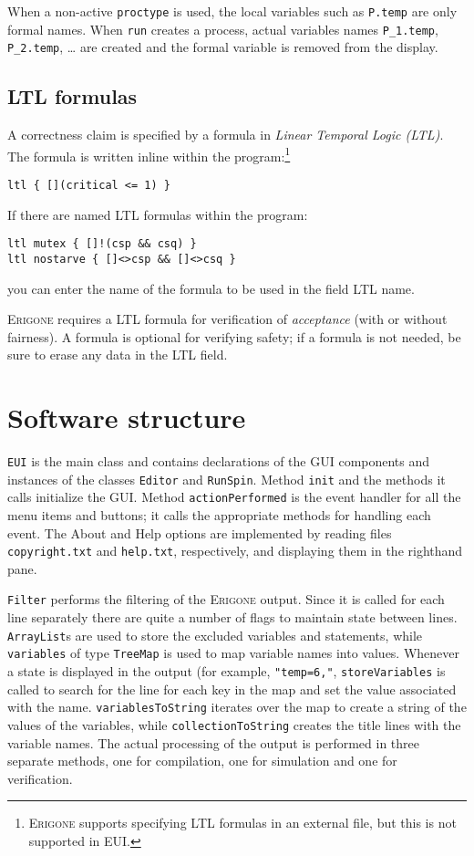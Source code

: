 \documentclass[11pt]{article}
\newcommand{\eri}{\textsc{Erigone}}
\newcommand{\eui}{\textsc{EUI}}
\newcommand{\p}[1]{\texttt{#1}}
\newcommand{\bu}[1]{\textsf{#1}}
\begin{document}
When a non-active \p{proctype} is used, the local variables such as
\p{P.temp} are only formal names. When \p{run} creates a process, actual
variables names \p{P\_1.temp}, \p{P\_2.temp}, \ldots{} are created and
the formal variable is removed from the display.

\subsection{LTL formulas}\label{s.ltlname}
A correctness claim is specified by a formula
in \emph{Linear Temporal Logic (LTL)}. The formula is written inline
within the program:\footnote{\eri{} supports specifying LTL formulas in
an external file, but this is not supported in \eui{}.}
\begin{verbatim}
ltl { [](critical <= 1) }
\end{verbatim}
If there are named LTL formulas within the program:
\begin{verbatim}
ltl mutex { []!(csp && csq) }
ltl nostarve { []<>csp && []<>csq }
\end{verbatim}
you can enter the name of the formula to be used in the field \bu{LTL
name}.

\eri{} requires a LTL formula for verification of \emph{acceptance}
(with or without fairness). A formula is optional for verifying safety;
if a formula is not needed, be sure to erase any data in the LTL field.

\newpage

\section{Software structure}

\p{EUI} is the main class and contains declarations of the GUI
components and instances of the classes \p{Editor} and \p{RunSpin}.
Method \p{init} and the methods it calls initialize the GUI. Method
\p{action\-Per\-formed} is the event handler for all the menu items and
buttons; it calls the appropriate methods for handling each event. The
\bu{About} and \bu{Help} options are implemented by reading files
\p{copyright.txt} and \p{help.txt}, respectively, and displaying them in
the righthand pane.

\p{Filter} performs the filtering of the \eri{} output. Since it is
called for each line separately there are quite a number of flags to
maintain state between lines. \p{ArrayList}s are used to store the
excluded variables and statements, while \p{variables} of type
\p{TreeMap} is used to map variable names into values. Whenever a state
is displayed in the output (for example, \p{"temp=6,"},
\p{storeVariables} is called to search for the line for each key in the
map and set the value associated with the name. \p{variablesToString}
iterates over the map to create a string of the values of the variables,
while \p{collectionToString} creates the title lines with the variable
names. The actual processing of the output is performed in three
separate methods, one for compilation, one for simulation and one for
verification.
\end{document}
